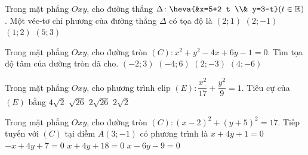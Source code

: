 \begin{ex}%
	Trong mặt phẳng $Oxy$, cho đường thẳng $\Delta\colon\heva{&x=5+2 t \\& y=3-t}(t \in \mathbb{R})$. Một véc-tơ chỉ phương của đường thẳng $\Delta$ có tọa độ là
	\choice
	{$(2; 1)$}
	{\True $(2; -1)$}
	{$(1; 2)$}
	{$(5; 3)$}
\end{ex}
\begin{ex}%
	Trong mặt phẳng $Oxy$, cho đường tròn $(C)\colon x^2+y^2-4x+6y-1=0$. Tìm tọa độ tâm của đường tròn đã cho.
	\choice
	{$(-2; 3)$}
	{$(-4; 6)$}
	{\True $(2;-3)$}
	{$(4;-6)$}
\end{ex}
\begin{ex}%
	Trong mặt phẳng $Oxy$, cho phương trình elip $(E)\colon \dfrac{x^2}{17}+\dfrac{y^2}{9}=1$. Tiêu cự của $(E)$ bằng
	\choice
	{\True $4\sqrt{2}$}
	{$\sqrt{26}$}
	{$2\sqrt{26}$}
	{$2\sqrt{2}$}
\end{ex}
\begin{ex}%
	Trong mặt phẳng $Oxy$, cho đường tròn $(C)\colon(x-2)^2+(y+5)^2=17$. Tiếp tuyến với $(C)$ tại điềm $A(3;-1)$ có phương trình là
	\choice
	{\True $x+4y+1=0$}
	{$-x+4y+7=0$}
	{$x+4y+18=0$}
	{$x-6y-9=0$}
\end{ex}
